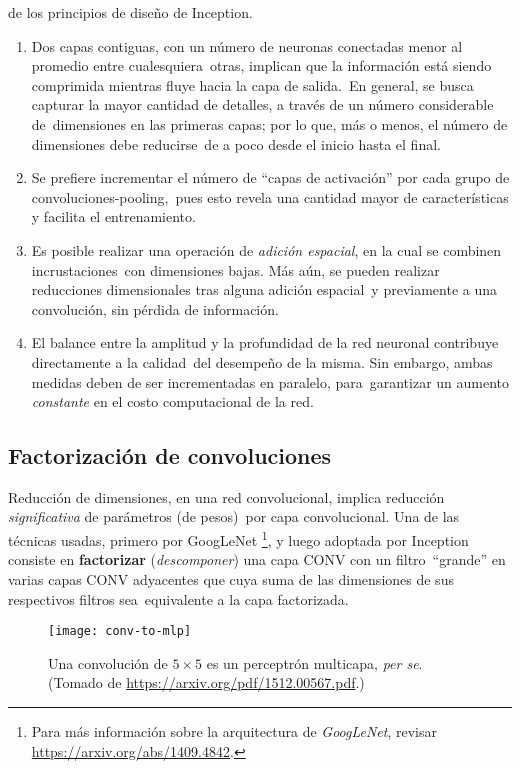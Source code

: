 de los principios de diseño de Inception.
\begin{enumerate}[label=\textbf{P.\arabic*}]
\item Dos capas contiguas, con un número de neuronas conectadas menor al promedio entre cualesquiera\
  otras, implican que la información está siendo comprimida mientras fluye hacia la capa de salida.\
  En general, se busca capturar la mayor cantidad de detalles, a través de un número considerable de\
  dimensiones en las primeras capas; por lo que, más o menos, el número de dimensiones debe reducirse\
  de a poco desde el inicio hasta el final.
\item Se prefiere incrementar el número de ``capas de activación'' por cada grupo de convoluciones-pooling,\
  pues esto revela una cantidad mayor de características y facilita el entrenamiento.
\item \label{sp-agg} Es posible realizar una operación de \emph{adición espacial}, en la cual se combinen incrustaciones\
  con dimensiones bajas. Más aún, se pueden realizar reducciones dimensionales tras alguna adición espacial\
  y previamente a una convolución, sin pérdida de información.
\item El balance entre la amplitud y la profundidad de la red neuronal contribuye directamente a la calidad\
  del desempeño de la misma. Sin embargo, ambas medidas deben de ser incrementadas en paralelo, para\
  garantizar un aumento \emph{constante} en el costo computacional de la red.
\end{enumerate}

\subsection{Factorización de convoluciones}

Reducción de dimensiones, en una red convolucional, implica reducción \emph{significativa} de parámetros (de pesos)\
por capa convolucional. Una de las técnicas usadas, primero por GoogLeNet
\footnote{
  Para más información sobre la arquitectura de \emph{GoogLeNet}, revisar \url{https://arxiv.org/abs/1409.4842}.
},
y luego adoptada por Inception consiste en \textbf{factorizar} (\emph{descomponer}) una capa CONV con un filtro\
``grande'' en varias capas CONV adyacentes que cuya suma de las dimensiones de sus respectivos filtros sea\
equivalente a la capa factorizada.\par

\begin{figure}[H]
  \centering
  \texttt{[image: conv-to-mlp]}
  \caption{Una convolución de $5 \times 5$ es un perceptrón multicapa, \emph{per se}.
    (Tomado de \url{https://arxiv.org/pdf/1512.00567.pdf}.)}
  \label{conv-to-mlp}
\end{figure}


